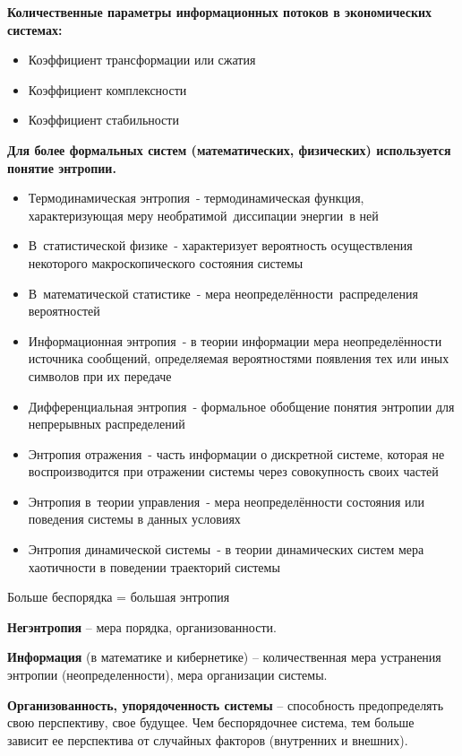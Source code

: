 \documentclass[a4paper]{article}
\begin{document}
	\textbf{Количественные параметры информационных потоков в экономических системах:}
	\begin{itemize}
		\item Коэффициент трансформации или сжатия
		\item Коэффициент комплексности
		\item Коэффициент стабильности
	\end{itemize}

	\textbf{Для более формальных систем (математических, физических) используется понятие энтропии.}
	\begin{itemize}
		\item Термодинамическая энтропия - термодинамическая функция, характеризующая меру необратимой диссипации энергии в ней
		\item В статистической физике - характеризует вероятность осуществления некоторого макроскопического состояния системы
		\item В математической статистике - мера неопределённости распределения вероятностей
		\item Информационная энтропия - в теории информации мера неопределённости источника сообщений, определяемая вероятностями появления тех или иных символов при их передаче
		\item Дифференциальная энтропия - формальное обобщение понятия энтропии для непрерывных распределений
		\item Энтропия отражения - часть информации о дискретной системе, которая не воспроизводится при отражении системы через совокупность своих частей
		\item Энтропия в теории управления - мера неопределённости состояния или поведения системы в данных условиях
		\item Энтропия динамической системы - в теории динамических систем мера хаотичности в поведении траекторий системы
	\end{itemize}

Больше беспорядка = большая энтропия

\textbf{Негэнтропия} – мера порядка, организованности.

\textbf{Информация} (в математике и кибернетике) – количественная мера устранения энтропии (неопределенности), мера организации системы.

\textbf{Организованность, упорядоченность системы} – способность предопределять свою перспективу, свое будущее. Чем беспорядочнее система, тем больше зависит ее перспектива от случайных факторов (внутренних и внешних). 
\end{document}
